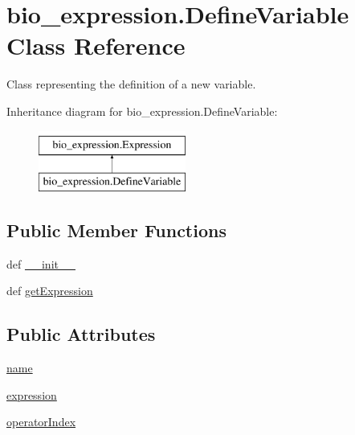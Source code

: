 \hypertarget{classbio__expression_1_1_define_variable}{\section{bio\+\_\+expression.\+Define\+Variable Class Reference}
\label{classbio__expression_1_1_define_variable}
}


Class representing the definition of a new variable.  


Inheritance diagram for bio\+\_\+expression.\+Define\+Variable\+:\begin{figure}[H]
\begin{center}
\leavevmode
\includegraphics[height=2.000000cm]{de/d2b/classbio__expression_1_1_define_variable}
\end{center}
\end{figure}
\subsection*{Public Member Functions}
\begin{DoxyCompactItemize}
\item 
def \hyperlink{classbio__expression_1_1_define_variable_a38cfcca48dc82ed6ce11cbba0a931026}{\+\_\+\+\_\+init\+\_\+\+\_\+}
\item 
def \hyperlink{classbio__expression_1_1_define_variable_ae005a4c392c3a5b21d24117e453ad8a7}{get\+Expression}
\end{DoxyCompactItemize}
\subsection*{Public Attributes}
\begin{DoxyCompactItemize}
\item 
\hyperlink{classbio__expression_1_1_define_variable_ad6fbc0e163c5cd0a76e0d86960d831a7}{name}
\item 
\hyperlink{classbio__expression_1_1_define_variable_a06ba185542aaef35a3ed57c92b427126}{expression}
\item 
\hyperlink{classbio__expression_1_1_define_variable_a4f43782aed1e3a2fdf23b75480952cd5}{operator\+Index}
\end{DoxyCompactItemize}


